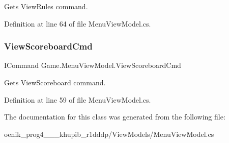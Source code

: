Gets View\+Rules command. 



Definition at line 64 of file Menu\+View\+Model.\+cs.

\mbox{\label{class_game_1_1_menu_view_model_ab3871a0b95d7e3006da23bf668e28e86}} 
\subsubsection{\texorpdfstring{ViewScoreboardCmd}{ViewScoreboardCmd}}
{\footnotesize\ttfamily I\+Command Game.\+Menu\+View\+Model.\+View\+Scoreboard\+Cmd\hspace{0.3cm}{\ttfamily [get]}}



Gets View\+Scoreboard command. 



Definition at line 59 of file Menu\+View\+Model.\+cs.



The documentation for this class was generated from the following file\+:\begin{DoxyCompactItemize}
\item 
oenik\+\_\+prog4\+\_\+\_\+\_\+khupib\+\_\+r1dddp/\+View\+Models/Menu\+View\+Model.\+cs\end{DoxyCompactItemize}
